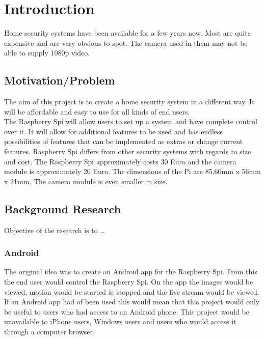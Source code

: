 \documentclass[]{report}
\begin{document}
\tableofcontents
\chapter{Introduction}
\label{ch:intro} 

Home security systems have been available for a few years now. Most are quite expensive and are very obvious to spot. The camera used in them may not be able to supply 1080p video.

\section{Motivation/Problem}
\label{sec:motprob}
The aim of this project is to create a home security system in a different way. It will be affordable and easy to use for all kinds of end users.\\

The Raspberry Spi will allow users to set up a system and have complete control over it. It will allow for additional features to be used and has endless possibilities of features that can be implemented as extras or change current features. 
Raspberry Spi differs from other security systems with regards to size and cost. The Raspberry Spi approximately costs 30 Euro and the camera module is approximately 20 Euro. The dimensions of the Pi are 85.60mm x 56mm x 21mm. The camera module is even smaller in size.
% 
\section{Background Research}
\label{sec:research}
Objective of the research is to \ldots

\subsection{Android}
\label{subsec:Android}
The original idea was to create an Android app for the Raspberry Spi. From this the end user would control the Raspberry Spi. On the app the images would be viewed, motion would be started \& stopped and the live stream would be viewed.\\

If an Android app had of been used this would mean that this project would only be useful to users who had access to an Android phone. This project would be unavailable to iPhone users, Windows users and users who would access it through a computer browser.
\end{document}
